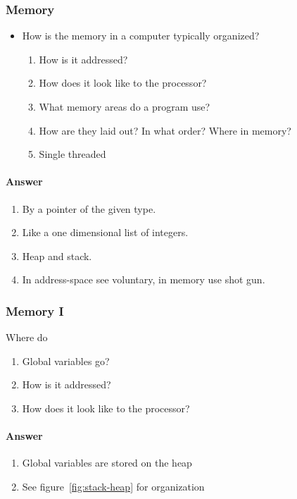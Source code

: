 
\subsubsection*{Memory}

\begin{itemize}
\item How is the memory in a computer typically organized?
  \begin{enumerate}
    \item How is it addressed?
    \item How does it look like to the processor?
    \item What memory areas do a program use?
    \item How are they laid out? In what order? Where in memory?
    \item Single threaded

  \end{enumerate}
\end{itemize}

\paragraph{Answer}
\begin{enumerate}
  \item By a pointer of the given type.
  \item Like a one dimensional list of integers.
  \item Heap and stack.
  \item In address-space see voluntary, in memory use shot gun.
\end{enumerate}


\subsubsection*{Memory I}

Where do
\begin{enumerate}
\item Global variables go?
\item How is it addressed?
\item How does it look like to the processor?
\end{enumerate}

\paragraph{Answer}
\begin{enumerate}
  \item Global variables are stored on the heap
  \item See figure~\ref{fig:stack-heap} for organization
\end{enumerate}


